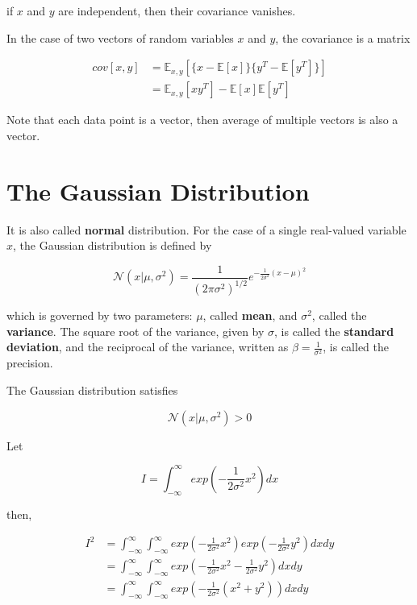 if $x$ and $y$ are independent, then their covariance vanishes.

In the case of two vectors of random variables $x$ and $y$, the covariance is a matrix

\begin{equation}
    \begin{split}
        cov[x, y] & = \mathbb{E}_{x, y}[\{x - \mathbb{E}[x]\}\{y^T -  \mathbb{E}[y^T]\}]\\
        & = \mathbb{E}_{x, y}[xy^T] - \mathbb{E}[x]\mathbb{E}[y^T]
    \end{split}
\end{equation}

Note that each data point is a vector, then average of multiple vectors is also a vector.

\section{The Gaussian Distribution}
It is also called \textbf{normal} distribution. For the case of a single real-valued variable $x$, the Gaussian distribution is defined by

\begin{equation}
    \mathcal{N}(x | \mu, \sigma^2) = \frac{1}{(2\pi \sigma ^2)^{1/2}} e^{-\frac{1}{2\sigma^2}(x - \mu)^2}
\end{equation}

which is governed by two parameters: $\mu$, called \textbf{mean}, and $\sigma^2$, called the \textbf{variance}. The square root of the variance, given by $\sigma$, is called the \textbf{standard deviation}, and the reciprocal of the variance, written as $\beta = \frac{1}{\sigma^2}$, is called the precision.

The Gaussian distribution satisfies

\begin{equation}
    \mathcal{N}(x | \mu, \sigma^2) > 0
\end{equation}

Let 

\begin{equation}
    I = \int_{- \infty}^{\infty} exp(- \frac{1}{2 \sigma^2}x^2)dx 
\end{equation}

then,

\begin{equation}
    \begin{split}
        I^2 & = \int_{- \infty}^{\infty} \int_{- \infty}^{\infty} exp(- \frac{1}{2 \sigma^2}x^2) exp(- \frac{1}{2 \sigma^2}y^2)dxdy\\
        & = \int_{- \infty}^{\infty} \int_{- \infty}^{\infty} exp(- \frac{1}{2 \sigma^2}x^2 - \frac{1}{2 \sigma^2}y^2 )dxdy\\
        & = \int_{- \infty}^{\infty} \int_{- \infty}^{\infty} exp(- \frac{1}{2 \sigma^2}(x^2 + y^2) )dxdy\\
    \end{split} 
\end{equation}

